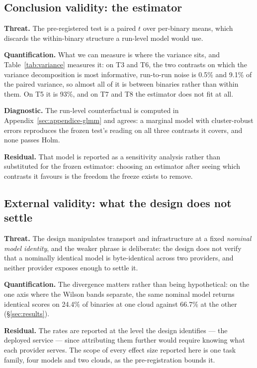 \subsection{Conclusion validity: the estimator}

\textbf{Threat.} The pre-registered test is a paired $t$ over per-binary means, which discards the
within-binary structure a run-level model would use.

\textbf{Quantification.} What we can measure is where the variance sits, and Table~\ref{tab:variance}
measures it: on T3 and T6, the two contrasts on which the variance decomposition is most informative,
run-to-run noise is 0.5\% and 9.1\% of the
paired variance, so almost all of it is between binaries rather than within them. On T5 it is 93\%, and on
T7 and T8 the estimator does not fit at all.

\textbf{Diagnostic.} The run-level counterfactual is computed in Appendix~\ref{sec:appendice-glmm} and
agrees: a marginal model with cluster-robust errors reproduces the frozen test's reading on all three
contrasts it covers, and none passes Holm.

\textbf{Residual.} That model is reported as a sensitivity analysis rather than substituted for the frozen
estimator: choosing an estimator after seeing which contrasts it favours is the freedom the freeze exists
to remove.

\subsection{External validity: what the design does not settle}

\textbf{Threat.} The design manipulates transport and infrastructure at a fixed \emph{nominal model
identity}, and the weaker phrase is deliberate: the design does not verify that a nominally identical
model is byte-identical across two providers, and neither provider exposes enough to settle it.

\textbf{Quantification.} The divergence matters rather than being hypothetical: on the one axis where the
Wilson bands separate, the same nominal model returns identical scores on 24.4\% of binaries at one cloud
against 66.7\% at the other (\S\ref{sec:results}).

\textbf{Residual.} The rates are reported at the level the design identifies --- the deployed service ---
since attributing them further would require knowing what each provider serves. The scope of every effect
size reported here is one task family, four models and two clouds, as the pre-registration bounds it.
